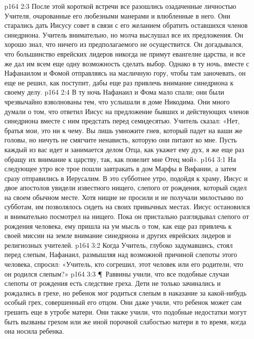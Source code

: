 \vs p164 2:3 После этой короткой встречи все разошлись озадаченные личностью Учителя, очарованные его любезными манерами и влюбленные в него. Они старались дать Иисусу совет в связи с его желанием обратить оставшихся членов синедриона. Учитель внимательно, но молча выслушал все их предложения. Он хорошо знал, что ничего из предполагаемого не осуществится. Он догадывался, что большинство еврейских лидеров никогда не примут евангелие царства, и все же дал им всем еще одну возможность сделать выбор. Однако в ту ночь, вместе с Нафанаилом и Фомой отправляясь на масличную гору, чтобы там заночевать, он еще не решил, как поступит, дабы еще раз привлечь внимание синедриона к своему делу.
\vs p164 2:4 В ту ночь Нафанаил и Фома мало спали; они были чрезвычайно взволнованы тем, что услышали в доме Никодима. Они много думали о том, что ответил Иисус на предложение бывших и действующих членов синедриона вместе с ним предстать перед семидесятью. Учитель сказал: «Нет, братья мои, это ни к чему. Вы лишь умножите гнев, который падет на ваши же головы, но ничуть не смягчите ненависть, которую они питают ко мне. Пусть каждый из вас идет и занимается делом Отца, как укажет ему дух, я же еще раз обращу их внимание к царству, так, как повелит мне Отец мой».
\vs p164 3:1 На следующее утро все трое пошли завтракать в дом Марфы в Вифании, а затем сразу отправились в Иерусалим. В это субботнее утро, подойдя к храму, Иисус и двое апостолов увидели известного нищего, слепого от рождения, который сидел на своем обычном месте. Хотя нищие не просили и не получали милостыню по субботам, им позволялось сидеть на своих привычных местах. Иисус остановился и внимательно посмотрел на нищего. Пока он пристально разглядывал слепого от рождения человека, ему пришла на ум мысль о том, как еще раз привлечь к своей миссии на земле внимание синедриона и других еврейских лидеров и религиозных учителей.
\vs p164 3:2 Когда Учитель, глубоко задумавшись, стоял перед слепым, Нафанаил, размышляя над возможной причиной слепоты этого человека, спросил: «Учитель, кто согрешил, этот человек или его родители, что он родился слепым?»
\vs p164 3:3 \P\ Раввины учили, что все подобные случаи слепоты от рождения есть следствие греха. Дети не только зачинались и рождались в грехе, но ребенок мог родиться слепым в наказание за какой\hyp{}нибудь особый грех, совершенный его отцом. Они даже учили, что ребенок может сам грешить еще в утробе матери. Они также учили, что подобные недостатки могут быть вызваны грехом или же иной порочной слабостью матери в то время, когда она носила ребенка.
